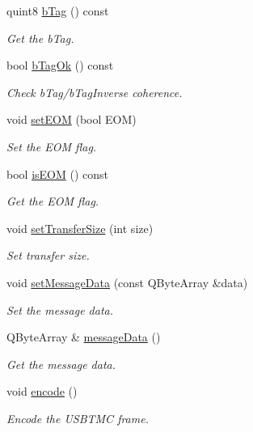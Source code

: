 \begin{DoxyCompactItemize}
quint8 \hyperlink{classmdt_frame_usb_tmc_a471c97b844331376ed1801cdb50f5cc6}{bTag} () const 
\begin{DoxyCompactList}\small\item\em Get the bTag. \end{DoxyCompactList}\item 
bool \hyperlink{classmdt_frame_usb_tmc_ae02dc125ea0e1b2fb0ae12ef43581703}{bTagOk} () const 
\begin{DoxyCompactList}\small\item\em Check bTag/bTagInverse coherence. \end{DoxyCompactList}\item 
void \hyperlink{classmdt_frame_usb_tmc_ab6e494c35eba34905987a75101fc48fe}{setEOM} (bool EOM)
\begin{DoxyCompactList}\small\item\em Set the EOM flag. \end{DoxyCompactList}\item 
bool \hyperlink{classmdt_frame_usb_tmc_a82e93db0fc709b951c0c1f7b70692b5c}{isEOM} () const 
\begin{DoxyCompactList}\small\item\em Get the EOM flag. \end{DoxyCompactList}\item 
void \hyperlink{classmdt_frame_usb_tmc_a7ad2f8426ebeceaa6f84925d9a96b5c0}{setTransferSize} (int size)
\begin{DoxyCompactList}\small\item\em Set transfer size. \end{DoxyCompactList}\item 
void \hyperlink{classmdt_frame_usb_tmc_a7fa61faeaa5d1f5820794c5943b26e26}{setMessageData} (const QByteArray \&data)
\begin{DoxyCompactList}\small\item\em Set the message data. \end{DoxyCompactList}\item 
QByteArray \& \hyperlink{classmdt_frame_usb_tmc_a03d9a1c16099ba7ea1e3a2b0c4e1493e}{messageData} ()
\begin{DoxyCompactList}\small\item\em Get the message data. \end{DoxyCompactList}\item 
void \hyperlink{classmdt_frame_usb_tmc_a9406dddfdd70f5dac729b2dbd728de77}{encode} ()
\begin{DoxyCompactList}\small\item\em Encode the USBTMC frame. \end{DoxyCompactList}\end{DoxyCompactItemize}


